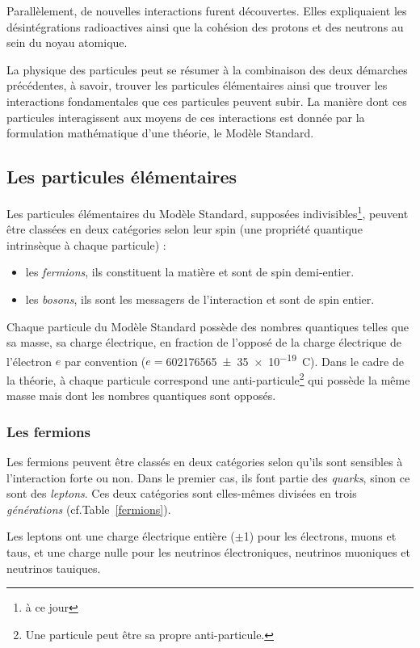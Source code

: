 \vspace*{-0.5cm}
Parallèlement, de nouvelles interactions furent découvertes. Elles expliquaient les désintégrations radioactives ainsi que la cohésion des protons et des neutrons au sein du noyau atomique.

La physique des particules peut se résumer à la combinaison des deux démarches précédentes, à savoir, trouver les particules élémentaires ainsi que trouver les interactions fondamentales que ces particules peuvent subir. La manière dont ces particules interagissent aux moyens de ces interactions est donnée par la formulation mathématique d'une théorie, le Modèle Standard.

\subsection{Les particules élémentaires}
Les particules élémentaires du Modèle Standard, supposées indivisibles\footnote{à ce jour}, peuvent être classées en deux catégories selon leur spin (une propriété quantique intrinsèque à chaque particule) :
\begin{itemize}[label=$\bullet$]
\item les \textit{fermions}, ils constituent la matière et sont de spin demi-entier.
\item les \textit{bosons}, ils sont les messagers de l'interaction et sont de spin entier.
\end{itemize}
Chaque particule du Modèle Standard possède des nombres quantiques telles que sa masse, sa charge électrique, en fraction de l'opposé de la charge électrique de l'électron $e$ par convention ($e=$\SI{602 176 565(35)e-19}{\coulomb}). Dans le cadre de la théorie, à chaque particule correspond une anti-particule\footnote{Une particule peut être sa propre anti-particule.} qui possède la même masse mais dont les nombres quantiques sont opposés.

\subsubsection{Les fermions}
Les fermions peuvent être classés en deux catégories selon qu'ils sont sensibles à l'interaction forte ou non. Dans le premier cas, ils font partie des \textit{quarks}, sinon ce sont des \textit{leptons}. Ces deux catégories sont elles-mêmes divisées en trois \textit{générations} (cf.Table~\ref{fermions}).

Les leptons ont une charge électrique entière ($\pm$\num{1}) pour les électrons, muons et taus, et une charge nulle pour les neutrinos électroniques, neutrinos muoniques et neutrinos tauiques.

